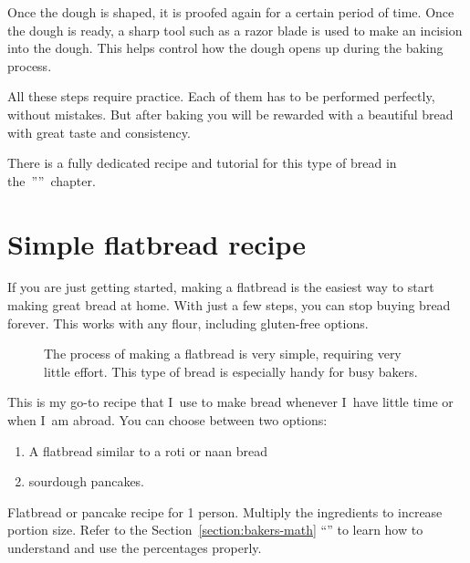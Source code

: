 Once the dough is shaped, it is proofed again for a certain
period of time. Once the dough is ready, a sharp tool such
as a razor blade is used to make an incision into the dough.
This helps control how the dough opens up during the baking process.

All these steps require practice. Each of them has to be
performed perfectly, without mistakes.
But after baking you will be rewarded with a beautiful bread
with great taste and consistency.

There is a fully dedicated recipe and tutorial
for this type of bread in the~''''~chapter.

\section{Simple flatbread recipe}%
\label{section:flat-bread-recipe}

If you are just getting started, making a flatbread is the
easiest way to start making great bread at home. With just a
few steps, you can stop buying bread forever. This works with
any flour, including gluten-free options.

\begin{figure}[!htb]
\begin{center}
  
  \caption{The process of making a flatbread is very simple, requiring very little effort. This
  type of bread is especially handy for busy bakers.}%
  \label{fig:flat-bread-process}
\end{center}
\end{figure}

This is my go-to recipe that I~use to make bread whenever
I~have little time or when I~am abroad. You can choose
between two options:
%
\begin{enumerate}
    \item A flatbread similar to a roti or naan bread
    \item sourdough pancakes.
\end{enumerate}

\begin{table}[!htb]
    \begin{center}
        
        \caption[Flatbread recipe]{Flatbread or pancake recipe for 1 person.
            Multiply the ingredients to increase portion size.  Refer to the
            Section~\ref{section:bakers-math}
            ``'' to learn how to understand and
            use the percentages properly.}%
            \label{tab:flat-bread-ingredients}
    \end{center}
\end{table}

